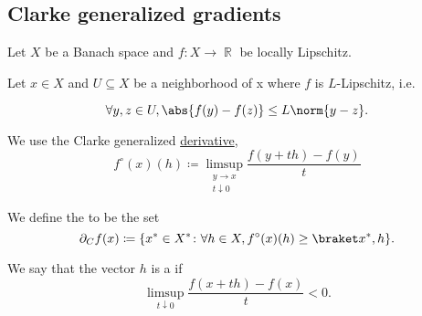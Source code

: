 \subsection{Clarke generalized gradients}\label{subsec:clarke_gradients}

Let \( X \) be a Banach space and \( f: X \to \BbbR \) be locally Lipschitz.

\begin{definition}\label{def:clarke_gradient}\mcite\cite[def. 10.3]{Clarke2013}
  Let \( x \in X \) and \( U \subseteq X \) be a neighborhood of x where \( f \) is \( L \)-Lipschitz, i.e.

  \begin{equation*}
    \forall y, z \in U, \abs{f(y) - f(z)} \leq L \norm{y - z}.
  \end{equation*}

  We use the Clarke generalized \hyperref[def:nonsmooth_derivatives/clarke]{derivative},
  \begin{equation*}
    f^\circ(x)(h) \coloneqq \limsup_{\substack{y \to x \\ t \downarrow 0}} \frac {f(y + th) - f(y)} t
  \end{equation*}

  We define the  to be the set
  \begin{equation*}
    \partial_C f(x) \coloneqq \{ x^* \in X^* \colon \forall h \in X, f^\circ(x)(h) \geq \inner {x^*} h \}.
  \end{equation*}

  We say that the vector \( h \) is a  if
  \begin{equation*}
    \limsup_{t \downarrow 0} \frac {f(x + th) - f(x)} t < 0.
  \end{equation*}
\end{definition}

